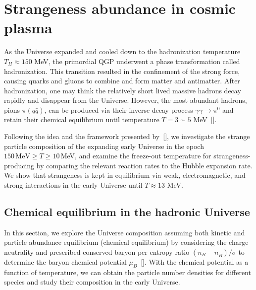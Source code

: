 \chapter
{Strangeness abundance in cosmic plasma}
\label{Strangeness}
As the Universe expanded and cooled down to the hadronization temperature $T_H\approx150$ MeV, the primordial QGP underwent a phase transformation called hadronization. This transition resulted in the confinement of the strong force, causing quarks and gluons to combine and form matter 
and antimatter. After hadronization, one may think the relatively short lived massive hadrons decay rapidly and disappear from the Universe. However, the most abundant hadrons, pions $\pi(q\bar q)$, can be produced via their inverse decay process $\gamma\gamma\rightarrow\pi^0$ and retain their chemical equilibrium until temperature $T=3\sim5$ MeV~[\cite{Kuznetsova:2008jt}]. 

Following the idea and the framework presented by~[\cite{Kuznetsova:2008jt}], we investigate the strange particle composition of the expanding early Universe in the epoch $150\,\mathrm{MeV}\ge T\ge 10$\,MeV, and examine the freeze-out temperature for strangeness-producing  by comparing the relevant reaction rates to the Hubble expansion rate. We show that strangeness is kept in equilibrium via weak, electromagnetic, and strong interactions in the early Universe until $T\approx13$ MeV.


 




\section{Chemical equilibrium in the hadronic Universe}

In this section, we explore the Universe composition assuming both kinetic and particle abundance equilibrium (chemical equilibrium) by considering the charge neutrality and prescribed conserved baryon-per-entropy-ratio ${(n_B-n_{\overline{B}})}/{\sigma}$ to determine the baryon chemical potential $\mu_B$~[\cite{Fromerth:2012fe,Rafelski:2013yka}]. With the chemical potential as a function of temperature, we can obtain the particle number densities for different species and study their composition in the early Universe.

